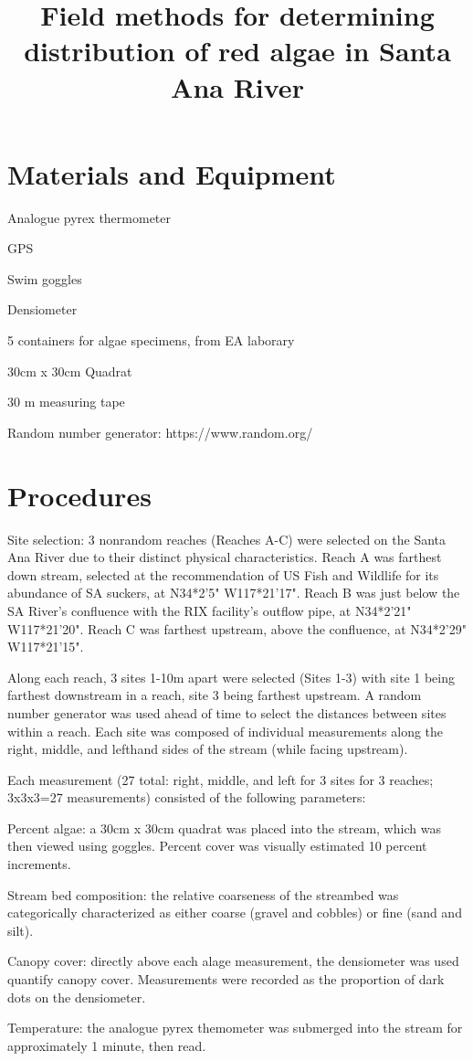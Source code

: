 \documentclass{article}\usepackage[]{graphicx}\usepackage[]{color}
\title{Field methods for determining distribution of red algae in Santa Ana River}
\begin{document}
\maketitle

\section{Materials and Equipment}

Analogue pyrex thermometer

GPS 

Swim goggles 

Densiometer 

5 containers for algae specimens, from EA laborary 

30cm x 30cm Quadrat

30 m measuring tape

Random number generator: https://www.random.org/

\section{Procedures}

Site selection: 3 nonrandom reaches (Reaches A-C) were selected on the Santa Ana River due to their distinct physical characteristics. Reach A was farthest down stream, selected at the recommendation of US Fish and Wildlife for its abundance of SA suckers, at N34*2'5" W117*21'17". Reach B was just below the SA River's confluence with the RIX facility's outflow pipe, at N34*2'21" W117*21'20". Reach C was farthest upstream, above the confluence, at N34*2'29" W117*21'15". 

Along each reach, 3 sites 1-10m apart were selected (Sites 1-3) with site 1 being farthest downstream in a reach, site 3 being farthest upstream. A random number generator was used ahead of time to select the distances between sites within a reach. Each site was composed of individual measurements along the right, middle, and lefthand sides of the stream (while facing upstream). 

Each measurement (27 total: right, middle, and left for 3 sites for 3 reaches; 3x3x3=27 measurements) consisted of the following parameters: 

Percent algae: a 30cm x 30cm quadrat was placed into the stream, which was then viewed using goggles. Percent cover was visually estimated 10 percent increments.

Stream bed composition: the relative coarseness of the streambed was categorically characterized as either coarse (gravel and cobbles) or fine (sand and silt).
   
Canopy cover: directly above each alage measurement, the densiometer was used quantify canopy cover. Measurements were recorded as the proportion of dark dots on the densiometer. 

Temperature: the analogue pyrex themometer was submerged into the stream for approximately 1 minute, then read. 
\end{document}
